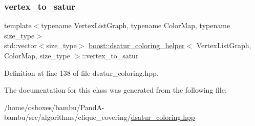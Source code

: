 \subsubsection{\texorpdfstring{vertex\+\_\+to\+\_\+satur}{vertex\_to\_satur}}
{\footnotesize\ttfamily template$<$typename Vertex\+List\+Graph, typename Color\+Map, typename size\+\_\+type$>$ \\
std\+::vector$<$size\+\_\+type$>$ \hyperlink{classboost_1_1dsatur__coloring__helper}{boost\+::dsatur\+\_\+coloring\+\_\+helper}$<$ Vertex\+List\+Graph, Color\+Map, size\+\_\+type $>$\+::vertex\+\_\+to\+\_\+satur\hspace{0.3cm}{\ttfamily [private]}}



Definition at line 138 of file dsatur\+\_\+coloring.\+hpp.



The documentation for this class was generated from the following file\+:\begin{DoxyCompactItemize}
\item 
/home/osboxes/bambu/\+Pand\+A-\/bambu/src/algorithms/clique\+\_\+covering/\hyperlink{dsatur__coloring_8hpp}{dsatur\+\_\+coloring.\+hpp}\end{DoxyCompactItemize}
